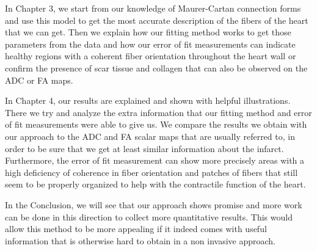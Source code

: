 In Chapter 3, we start from our knowledge of Maurer-Cartan connection forms and use this model to get the most accurate description of the fibers of the heart \cite{pami2015} that we can get. Then we explain how our fitting method works to get those parameters from the data and how our error of fit measurements can indicate healthy regions with a coherent fiber orientation throughout the heart wall or confirm the presence of scar tissue and collagen that can also be observed on the ADC or FA maps.

In Chapter 4, our results are explained and shown with helpful illustrations. There we try and analyze the extra information that our fitting method and error of fit measurements were able to give us. We compare the results we obtain with our approach to the ADC and FA scalar maps that are usually referred to, in order to be sure that we get at least similar information about the infarct. Furthermore, the error of fit measurement can show more precisely areas with a high deficiency of coherence in fiber orientation and patches of fibers that still seem to be properly organized to help with the contractile function of the heart.

In the Conclusion, we will see that our approach shows promise and more work can be done in this direction to collect more quantitative results. This would allow this method to be more appealing if it indeed comes with useful information that is otherwise hard to obtain in a non invasive approach.